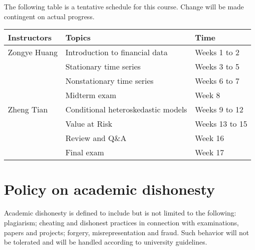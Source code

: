 \documentclass[a4paper,11pt]{article}
\begin{document}
The following table is a tentative schedule for this course. Change
will be made contingent on actual progress.

\begin{center}
\begin{tabular}{lll}
Instructors & Topics & Time\\
\hline
Zongye Huang & Introduction to financial data & Weeks 1 to 2\\
 & Stationary time series & Weeks 3 to 5\\
 & Nonstationary time series & Weeks 6 to 7\\
 & Midterm exam & Week 8\\
\hline
Zheng Tian & Conditional heteroskedastic models & Weeks 9 to 12\\
 & Value at Risk & Weeks 13 to 15\\
 & Review and Q\&A & Week 16\\
\hline
 & Final exam & Week 17\\
\end{tabular}
\end{center}


\section{Policy on academic dishonesty}
\label{sec:org08833c2}

Academic dishonesty is defined to include but is not limited to the
following: plagiarism; cheating and dishonest practices in connection
with examinations, papers and projects; forgery, misrepresentation and
fraud. Such behavior will not be tolerated and will be handled
according to university guidelines.
\end{document}
